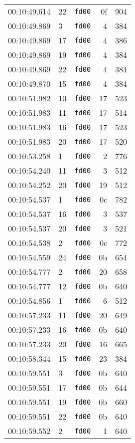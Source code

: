 \documentclass{article}
\begin{document}
\begin{longtable}{lllrr}
00:10:49.614 & 22 & \texttt{fd00} & 0f & 904 \\
00:10:49.869 & 3 & \texttt{fd00} & 4 & 384 \\
00:10:49.869 & 17 & \texttt{fd00} & 4 & 386 \\
00:10:49.869 & 19 & \texttt{fd00} & 4 & 384 \\
00:10:49.869 & 22 & \texttt{fd00} & 4 & 384 \\
00:10:49.870 & 15 & \texttt{fd00} & 4 & 384 \\
00:10:51.982 & 10 & \texttt{fd00} & 17 & 523 \\
00:10:51.983 & 11 & \texttt{fd00} & 17 & 514 \\
00:10:51.983 & 16 & \texttt{fd00} & 17 & 523 \\
00:10:51.983 & 20 & \texttt{fd00} & 17 & 520 \\
00:10:53.258 & 1 & \texttt{fd00} & 2 & 776 \\
00:10:54.240 & 11 & \texttt{fd00} & 3 & 512 \\
00:10:54.252 & 20 & \texttt{fd00} & 19 & 512 \\
00:10:54.537 & 1 & \texttt{fd00} & 0c & 782 \\
00:10:54.537 & 16 & \texttt{fd00} & 3 & 537 \\
00:10:54.537 & 20 & \texttt{fd00} & 3 & 521 \\
00:10:54.538 & 2 & \texttt{fd00} & 0c & 772 \\
00:10:54.559 & 24 & \texttt{fd00} & 0b & 654 \\
00:10:54.777 & 2 & \texttt{fd00} & 20 & 658 \\
00:10:54.777 & 12 & \texttt{fd00} & 0b & 640 \\
00:10:54.856 & 1 & \texttt{fd00} & 6 & 512 \\
00:10:57.233 & 11 & \texttt{fd00} & 20 & 649 \\
00:10:57.233 & 16 & \texttt{fd00} & 0b & 640 \\
00:10:57.233 & 20 & \texttt{fd00} & 16 & 665 \\
00:10:58.344 & 15 & \texttt{fd00} & 23 & 384 \\
00:10:59.551 & 3 & \texttt{fd00} & 0b & 640 \\
00:10:59.551 & 17 & \texttt{fd00} & 0b & 644 \\
00:10:59.551 & 19 & \texttt{fd00} & 0b & 660 \\
00:10:59.551 & 22 & \texttt{fd00} & 0b & 640 \\
00:10:59.552 & 2 & \texttt{fd00} & 1 & 640 \\

\end{longtable}
\end{document}
